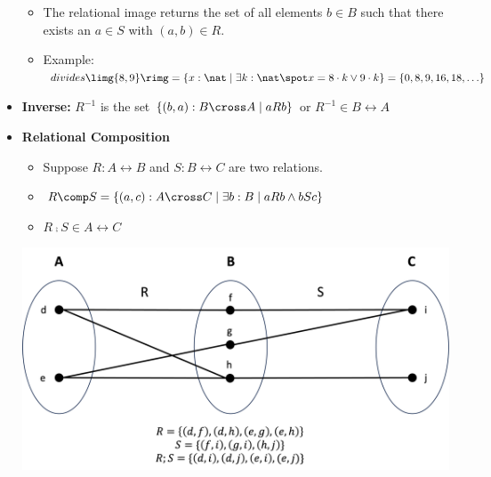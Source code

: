 \documentclass[10pt, landscape]{article}
\begin{document}
\begin{multicols*}{3}
\begin{center}
\begin{itemize}
\begin{itemize}
        \item The relational image returns the set of all elements $b \in B$ such that there exists an $a \in S$ with $(a, b) \in R$.
        \item Example: $divides \limg \{8, 9\} \rimg = \{x : \nat \mid \exists k : \nat \spot x = 8 \cdot k \vee 9 \cdot k \} = \{0, 8, 9, 16, 18, \ldots\}$
      \end{itemize}
      \item \textbf{Inverse:} $R^{-1}$ is the set $\{(b, a) : B \cross A \mid a R b \}$ or $R^{-1} \in B \rel A$
      \item \textbf{Relational Composition}
      \begin{itemize}
        \item Suppose $R: A \rel B$ and $S: B \rel C$ are two relations.
        \item $R \comp S = \{(a, c) : A \cross C \mid \exists b : B \mid a R b \wedge b S c\}$
        \item $R \comp S \in A \rel C$
      \end{itemize}
    \begin{center}
      \includegraphics[scale=0.2]{../images/L1_RelationalComposition.png}
    \end{center}
    \end{itemize}
  \end{center}

\end{multicols*}
\end{document}
